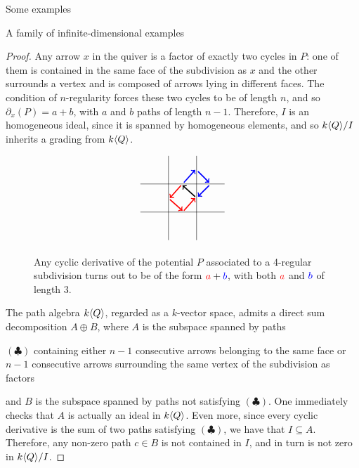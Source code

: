 \begin{chapter}{Some examples}
\begin{section}{A family of infinite-dimensional examples}
\begin{proof}
Any arrow $x$ in the quiver is a factor of exactly two cycles in $P$: one of them is contained in the same face of the subdivision as $x$ and the other surrounds a vertex and is composed of arrows lying in different faces. The condition of $n$-regularity forces these two cycles to be of length $n$, and so $\partial_x(P)= a+b$, with $a$ and $b$ paths of length $n-1$. Therefore, $I$ is an homogeneous ideal, since it is spanned by homogeneous elements, and so $k\langle Q\rangle/I$ inherits a grading from $k\langle Q\rangle$. 
\begin{figure}[h]
\[
\begin{tikzpicture}[scale=0.5]
\draw (-3,1) to (3,1);
\draw (-3, -1) to (3, -1);
\draw (-1, -3) to (-1, 3);
\draw (1, -3) to (1, 3);
\draw[very thick, ->] (0.9, 0.1) to (0, 0.9);
\draw[red, very thick, ->] (-0.1, 0.9) to (-0.9, 0);
\draw[red, very thick, ->] (-0.9, -0.1) to (0, -0.9);
\draw[red, very thick, ->] (0.1, -0.9) to (0.9, 0);
\draw[blue, very thick, ->] (0.1, 1.1) to (0.9, 2);
\draw[blue, very thick, ->] (1.1, 1.9) to (1.9, 1.1);
\draw[blue, very thick, ->] (1.9, 0.9) to (1.1, 0.1);
\end{tikzpicture}
\]
\begin{caption}{Any cyclic derivative of the potential $P$ associated to a 4-regular subdivision turns out to be of the form $\textcolor{red}{a} + \textcolor{blue}{b}$, with both $\textcolor{red}{a}$ and $\textcolor{blue}{b}$ of length 3.}
\end{caption}
\end{figure}

The path algebra $k\langle Q\rangle$, regarded as a $k$-vector space, admits a direct sum decomposition $A\oplus B$, where $A$ is the subspace spanned by paths 

$(\clubsuit)$ containing either $n-1$ consecutive arrows belonging to the same face or $n-1$ consecutive arrows surrounding the same vertex of the subdivision as factors 

and $B$ is the subspace spanned by paths not satisfying $(\clubsuit)$. One immediately checks that $A$ is actually an ideal in $k\langle Q\rangle$. Even more, since every cyclic derivative is the sum of two paths satisfying $(\clubsuit)$, we have that $I\subseteq A$. Therefore, any non-zero path $c\in B$ is not contained in $I$, and in turn is not zero in $k\langle Q\rangle/I$.


\end{proof}
\end{section}
\end{chapter}
